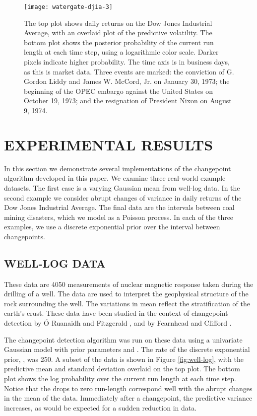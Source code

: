 \documentclass[]{article}
\begin{document}
      \begin{figure*}[t]
	\centering
	\texttt{[image: watergate-djia-3]}
	\vskip -0.5cm
	\caption{The top plot shows daily returns on the Dow Jones
	  Industrial Average, with an overlaid plot of the predictive
	  volatility.  The bottom plot shows the posterior probability of
	  the current run length  at each time
	  step, using a logarithmic color scale.  Darker pixels indicate
	  higher probability.  The time axis is in business days, as this
	  is market data.  Three events are marked: the conviction of
	  G. Gordon Liddy and James W. McCord, Jr. on January 30, 1973; the
	  beginning of the OPEC embargo against the United States on
	  October 19, 1973; and the resignation of President Nixon on
	  August 9, 1974.}
	\label{fig:watergate-djia}
      \end{figure*}
   
  \section{EXPERIMENTAL RESULTS}
    In this section we demonstrate several implementations of the
    changepoint algorithm developed in this paper.  We examine three
    real-world example datasets.  The first case is a varying Gaussian mean
    from well-log data.  In the second example we consider abrupt changes
    of variance in daily returns of the Dow Jones Industrial Average.  The
    final data are the intervals between coal mining disasters, which we
    model as a Poisson process.  In each of the three examples, we use a
    discrete exponential prior over the interval between changepoints.

    \subsection{WELL-LOG DATA}
      These data are 4050 measurements of nuclear magnetic response taken
      during the drilling of a well.  The data are used to interpret the
      geophysical structure of the rock surrounding the well.  The
      variations in mean reflect the stratification of the earth's crust.
      These data have been studied in the context of changepoint detection
      by \'{O} Ruanaidh and Fitzgerald \cite{oruanaidh-fitzgerald-1996a},
      and by Fearnhead and Clifford \cite{fearnhead-clifford-2003a}.

      The changepoint detection algorithm was run on these data using a
      univariate Gaussian model with prior parameters 
      and .  The rate of the discrete exponential
      prior, , was 250.  A subset of the data is
      shown in Figure \ref{fig:well-log}, with the predictive mean and
      standard deviation overlaid on the top plot.  The bottom plot shows
      the log probability over the current run length at each time step.
      Notice that the drops to zero run-length correspond well with the
      abrupt changes in the mean of the data.  Immediately after a
      changepoint, the predictive variance increases, as would be expected
      for a sudden reduction in data.
    
\end{document}
